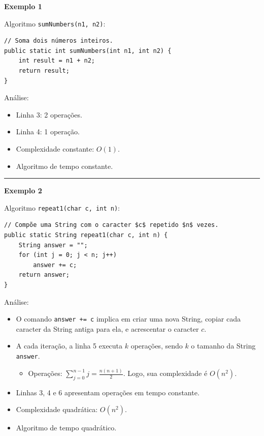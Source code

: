 
\textbf{Exemplo 1}

Algoritmo \texttt{sumNumbers(n1, n2)}:
\begin{verbatim}
// Soma dois números inteiros.
public static int sumNumbers(int n1, int n2) {
	int result = n1 + n2;
	return result;
}
\end{verbatim}

Análise:
\begin{itemize}
	\item Linha 3: 2 operações.
	\item Linha 4: 1 operação.
	\item Complexidade constante: $O(1)$.
	\item Algoritmo de tempo constante.
\end{itemize}

\medskip

\rule{\textwidth}{1pt}

\textbf{Exemplo 2}

Algoritmo \texttt{repeat1(char c, int n)}:
\begin{verbatim}
// Compõe uma String com o caracter $c$ repetido $n$ vezes.
public static String repeat1(char c, int n) {
	String answer = "";
	for (int j = 0; j < n; j++)
		answer += c;
	return answer;
}
\end{verbatim}

Análise:
\begin{itemize}
	\item O comando \texttt{answer += c} implica em criar uma nova String, copiar cada caracter da String antiga para ela, e acrescentar o caracter $c$.
	
	\item A cada iteração, a linha 5 executa $k$ operações, sendo $k$ o tamanho da String \texttt{answer}.
	\begin{itemize}
		\item Operações: $\displaystyle\sum_{j = 0}^{n - 1} j = \frac{n(n + 1)}{2}$. Logo, sua complexidade é $O(n^2)$.
	\end{itemize}
	
	\item Linhas 3, 4 e 6 apresentam operações em tempo constante.
	
	\item Complexidade quadrática: $O(n^2)$.
	\item Algoritmo de tempo quadrático.
\end{itemize}

\medskip

